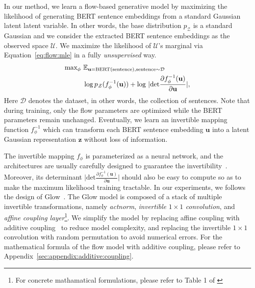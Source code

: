 \documentclass[11pt,a4paper]{article}
\def\rvu{{\mathbf{i}}}
\def\rvu{{\mathbf{u}}}
\def\rvz{{\mathbf{z}}}
\begin{document}
In our method, we learn a flow-based generative model
by maximizing the likelihood of generating BERT sentence embeddings from a standard Gaussian latent latent variable. In other words, the base distribution $p_{\mathcal{Z}}$ is a standard Gaussian and we consider the extracted BERT sentence embeddings as the observed space $\mathcal{U}$. We maximize the likelihood of $\mathcal{U}$'s marginal via Equation~\ref{eq:flow:mle} in a fully \emph{unsupervised} way.
\begin{align}
    \vspace{-10pt}
    \label{eq:flow:mle}
    \textrm{max}_{\phi}~
    & \mathbb{E}_{ \rvu = \textrm{BERT(sentence)}, \textrm{sentence} \sim \mathcal{D} }
      \nonumber \\
    & \log p_{\mathcal{Z}} (f_\phi^{-1} (\rvu)) + \log
    ~\lvert \textrm{det} \frac{\partial f_\phi^{-1} (\rvu)}{\partial \rvu} \rvert, 
    \vspace{-5pt}
\end{align}
Here $\mathcal{D}$ denotes the dataset, in other words, the collection of sentences. Note that during training, only the flow parameters are optimized while the BERT parameters remain unchanged. Eventually, we learn an invertible mapping function $f_\phi^{-1}$ which can transform each BERT sentence embedding $\rvu$ into a latent Gaussian representation $\rvz$ without loss of information.

The invertible mapping $f_\phi$ is parameterized as a neural network, and the architectures are usually carefully designed to guarantee the invertibility~\cite{dinh2014nice}. Moreover, its determinant $\lvert \textrm{det} \frac{\partial f_\phi^{-1} (\rvu)}{\partial \rvu} \rvert$  should also be easy to compute so as to make the maximum likelihood training tractable. In our experiments, we follows the design of Glow~\cite{kingma2018glow}. The Glow model is composed of a stack of multiple invertible transformations, namely \textit{actnorm}, \textit{invertible $1\times1$ convolution}, and \textit{affine coupling layer}\footnote{For concrete mathamatical formulations, please refer to Table 1 of \citet{kingma2018glow}}.
We simplify the model by replacing affine coupling with additive coupling~\cite{dinh2014nice} to reduce model complexity, and replacing the invertible $1\times1$ convolution with random permutation to avoid numerical errors. For the mathematical formula of the flow model with additive coupling, please refer to Appendix~\ref{sec:appendix:additive:coupling}.
\end{document}
